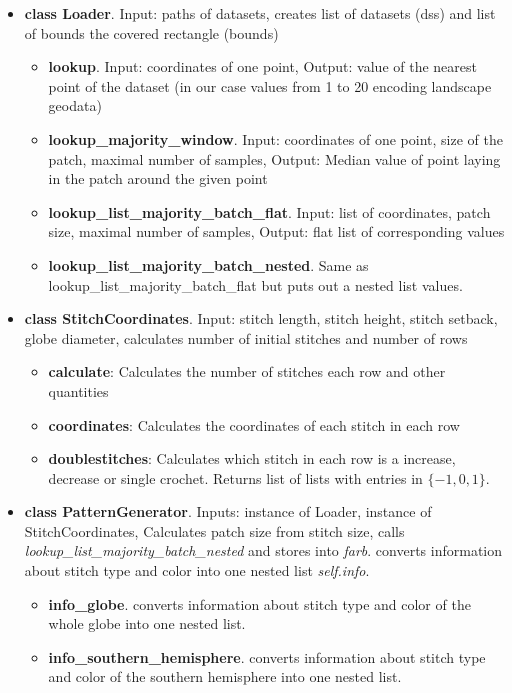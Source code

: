 \documentclass{article}
\begin{document}
	
	\begin{itemize}
		\item \textbf{class Loader}. Input: paths of datasets, creates list of datasets (dss) and list of bounds the covered rectangle (bounds) 
		\begin{itemize}
			\item \textbf{lookup}. Input: coordinates of one point, Output: value of the nearest point of the dataset (in our case values from 1 to 20 encoding landscape geodata)
			\item \textbf{lookup\_majority\_window}. Input: coordinates of one point, size of the patch, maximal number of samples, Output: Median value of point laying in the patch around the given point
			\item \textbf{lookup\_list\_majority\_batch\_flat}. Input: list of coordinates, patch size, maximal number of samples, Output: flat list of corresponding values
			\item \textbf{lookup\_list\_majority\_batch\_nested}. Same as lookup\_list\_majority\_batch\_flat but puts out a nested list values.
		\end{itemize}
		\item \textbf{class StitchCoordinates}. Input: stitch length, stitch height, stitch setback, globe diameter, calculates number of initial stitches and number of rows
		\begin{itemize}
			\item \textbf{calculate}: Calculates the number of stitches each row and other quantities
			\item \textbf{coordinates}: Calculates the coordinates of each stitch in each row
			\item \textbf{doublestitches}: Calculates which stitch in each row is a increase, decrease or single crochet. Returns list of lists with entries in \(\{-1,0,1\}\).
		\end{itemize}
		\item \textbf{class PatternGenerator}. Inputs: instance of Loader, instance of StitchCoordinates, Calculates patch size from stitch size, calls \textit{lookup\_list\_majority\_batch\_nested} and stores into \textit{farb}. converts information about stitch type and color into one nested list \textit{self.info}.
		\begin{itemize}
			\item \textbf{info\_globe}. converts information about stitch type and color of the whole globe into one nested list.
			\item \textbf{info\_southern\_hemisphere}. converts information about stitch type and color of the southern hemisphere into one nested list.

\end{itemize}
\end{itemize}
\end{document}
